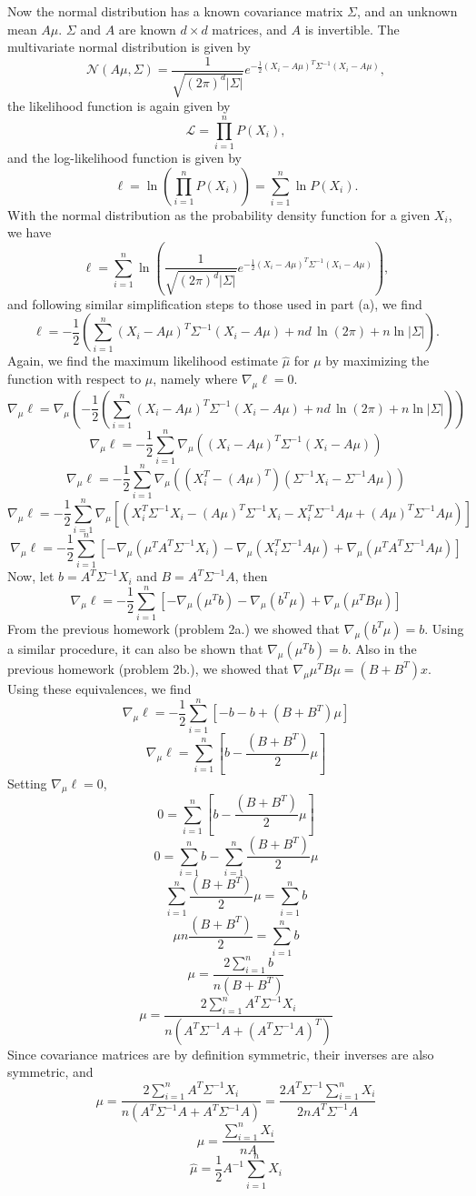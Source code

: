 \documentclass{report}
\begin{document}
Now the normal distribution has a known covariance matrix $\Sigma$, and an unknown mean $A\mu$. $\Sigma$ and $A$ are known $d \times d$ matrices, and $A$ is invertible. The multivariate normal distribution is given by
$$ \mathcal{N}(A\mu,\Sigma) = \frac{1}{\sqrt{(2\pi)^d|\Sigma|}}e^{-\frac{1}{2}(X_i-A\mu)^T\Sigma^{-1}(X_i-A\mu)} ,$$
the likelihood function is again given by
$$ \mathcal{L} = \prod_{i=1}^n{P(X_i)}, $$
and the log-likelihood function is given by
$$ \ell = \ln\left(\prod_{i=1}^n{P(X_i)}\right) = \sum_{i=1}^n{\ln P(X_i)}. $$
With the normal distribution as the probability density function for a given $X_i$, we have
$$ \ell = \sum_{i=1}^n{\ln \left(\frac{1}{\sqrt{(2\pi)^d|\Sigma|}}e^{-\frac{1}{2}(X_i-A\mu)^T\Sigma^{-1}(X_i-A\mu)}\right)}, $$
and following similar simplification steps to those used in part (a), we find
$$ \ell = -\frac{1}{2}\left(\sum_{i=1}^n{(X_i-A\mu)^T\Sigma^{-1}(X_i-A\mu)} + nd\,{\ln (2\pi)} + n\ln |\Sigma| \right) .$$
Again, we find the maximum likelihood estimate $\hat{\mu}$ for $\mu$ by maximizing the function with respect to $\mu$, namely where $\nabla_{\mu}\ell = 0$.
$$ \nabla_{\mu} \ell = \nabla_{\mu} \left(-\frac{1}{2}\left(\sum_{i=1}^n{(X_i-A\mu)^T\Sigma^{-1}(X_i-A\mu)} + nd\,{\ln (2\pi)} + n\ln |\Sigma| \right) \right) $$
$$ \nabla_{\mu} \ell = -\frac{1}{2} \sum_{i=1}^n{\nabla_{\mu} \left((X_i-A\mu)^T\Sigma^{-1}(X_i-A\mu)\right)} $$
$$ \nabla_{\mu} \ell = -\frac{1}{2} \sum_{i=1}^n{\nabla_{\mu} \left((X_i^T-(A\mu)^T)(\Sigma^{-1}X_i-\Sigma^{-1}A\mu)\right)} $$
$$ \nabla_{\mu} \ell = -\frac{1}{2} \sum_{i=1}^n{\nabla_{\mu} \left[(X_i^T\Sigma^{-1}X_i-(A\mu)^T\Sigma^{-1}X_i - X_i^T\Sigma^{-1}A\mu + (A\mu)^T\Sigma^{-1}A\mu)\right]} $$
$$ \nabla_{\mu} \ell = -\frac{1}{2} \sum_{i=1}^n{\left[-\nabla_{\mu}(\mu^TA^T\Sigma^{-1}X_i)- \nabla_{\mu}(X_i^T\Sigma^{-1}A\mu) + \nabla_{\mu}(\mu^TA^T\Sigma^{-1}A\mu)\right]} $$
Now, let $b = A^T\Sigma^{-1}X_i$ and $B = A^T\Sigma^{-1}A$, then
$$ \nabla_{\mu} \ell = -\frac{1}{2} \sum_{i=1}^n{\left[-\nabla_{\mu}(\mu^Tb)- \nabla_{\mu}(b^T\mu) + \nabla_{\mu}(\mu^TB\mu)\right]} $$
From the previous homework (problem 2a.) we showed that $\nabla_{\mu}(b^T\mu) = b$. Using a similar procedure, it can also be shown that $\nabla_{\mu}(\mu^Tb) = b$. Also in the previous homework (problem 2b.), we showed that $\nabla_{\mu}{\mu^TB\mu} = (B + B^T)x$. Using these equivalences, we find
$$ \nabla_{\mu} \ell = -\frac{1}{2} \sum_{i=1}^n{\left[-b - b + (B+B^T)\mu \right]} $$
$$ \nabla_{\mu} \ell = \sum_{i=1}^n{\left[b - \frac{(B+B^T)}{2}\mu \right]} $$
Setting $ \nabla_{\mu} \ell = 0 $,
$$ 0 = \sum_{i=1}^n{\left[b - \frac{(B+B^T)}{2}\mu \right]} $$
$$ 0 = \sum_{i=1}^n{b} - \sum_{i=1}^n{\frac{(B+B^T)}{2}\mu} $$
$$ \sum_{i=1}^n{\frac{(B+B^T)}{2}\mu} = \sum_{i=1}^n{b} $$
$$ \mu n \frac{(B+B^T)}{2} = \sum_{i=1}^n{b} $$
$$ \mu = \frac{2\sum_{i=1}^n{b}}{n(B+B^T)} $$
$$ \mu = \frac{2\sum_{i=1}^n{A^T\Sigma^{-1}X_i}}{n(A^T\Sigma^{-1}A+(A^T\Sigma^{-1}A)^T)} $$
Since covariance matrices are by definition symmetric, their inverses are also symmetric, and 
$$ \mu = \frac{2\sum_{i=1}^n{A^T\Sigma^{-1}X_i}}{n(A^T\Sigma^{-1}A+A^T\Sigma^{-1}A)} = \frac{2A^T\Sigma^{-1}\sum_{i=1}^n{X_i}}{2nA^T\Sigma^{-1}A} $$
$$ \mu = \frac{\sum_{i=1}^n{X_i}}{nA} $$
$$\boxed{ \hat{\mu} = \frac{1}{2} A^{-1} \sum_{i=1}^n{X_i} }$$
\end{document}
